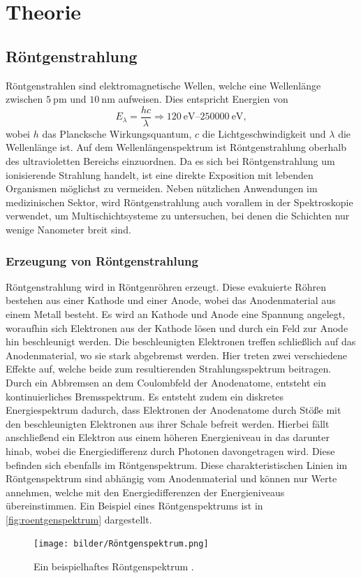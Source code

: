 \chapter{Theorie}
\label{cha:Theorie}

\section{Röntgenstrahlung}

Röntgenstrahlen sind elektromagnetische Wellen, welche eine Wellenlänge zwischen $\qty{5}{\pico\metre}$ und $\qty{10}{\nano\metre}$ aufweisen.
Dies entspricht Energien von
\begin{equation*}
    E_{\lambda} = \frac{hc}{\lambda} \Rightarrow \qtyrange{120}{250000}{\electronvolt},
\end{equation*}
wobei $h$ das Plancksche Wirkungsquantum, $c$ die Lichtgeschwindigkeit und $\lambda$ die Wellenlänge ist. Auf dem Wellenlängenspektrum ist Röntgenstrahlung
oberhalb des ultravioletten Bereichs einzuordnen. Da es sich bei Röntgenstrahlung um ionisierende Strahlung handelt, ist eine direkte Exposition mit lebenden
Organismen möglichst zu vermeiden. Neben nützlichen Anwendungen im medizinischen Sektor, wird Röntgenstrahlung auch vorallem in der Spektroskopie verwendet,
um Multischichtsysteme zu untersuchen, bei denen die Schichten nur wenige Nanometer breit sind.

\subsection{Erzeugung von Röntgenstrahlung}
Röntgenstrahlung wird in Röntgenröhren erzeugt. Diese evakuierte Röhren bestehen aus einer Kathode und einer Anode, wobei das Anodenmaterial aus einem Metall besteht. 
Es wird an Kathode und Anode eine Spannung angelegt, woraufhin sich Elektronen aus der Kathode lösen und durch ein Feld zur Anode hin beschleunigt werden. Die 
beschleunigten Elektronen treffen schließlich auf das Anodenmaterial, wo sie stark abgebremst werden. Hier treten zwei verschiedene Effekte auf, welche beide
zum resultierenden Strahlungsspektrum beitragen.\\
Durch ein Abbremsen an dem Coulombfeld der Anodenatome, entsteht ein kontinuierliches Bremsspektrum. Es entsteht zudem ein diskretes Energiespektrum dadurch,
dass Elektronen der Anodenatome durch Stöße mit den beschleunigten Elektronen aus ihrer Schale befreit werden. Hierbei fällt anschließend ein Elektron aus einem
höheren Energieniveau in das darunter hinab, wobei die Energiedifferenz durch Photonen davongetragen wird. Diese befinden sich ebenfalls im Röntgenspektrum.
Diese charakteristischen Linien im Röntgenspektrum sind abhängig vom Anodenmaterial und können nur Werte annehmen, welche mit den Energiedifferenzen der Energieniveaus
übereinstimmen. Ein Beispiel eines Röntgenspektrums ist in \autoref{fig:roentgenspektrum} dargestellt.
\begin{figure}
    \centering
    \texttt{[image: bilder/Röntgenspektrum.png]}
    \caption{Ein beispielhaftes Röntgenspektrum \cite{Uni_Goett}.}
    \label{fig:roentgenspektrum}
\end{figure}

